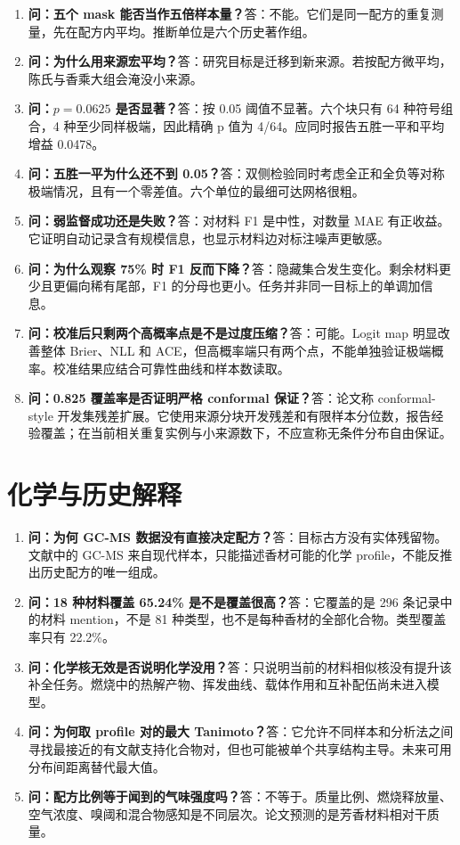\documentclass[UTF8,11pt,openany,fontset=none]{ctexbook}
\begin{document}
\begin{enumerate}[resume]
\item \textbf{问：五个 mask 能否当作五倍样本量？}\quad 答：不能。它们是同一配方的重复测量，先在配方内平均。推断单位是六个历史著作组。
\item \textbf{问：为什么用来源宏平均？}\quad 答：研究目标是迁移到新来源。若按配方微平均，陈氏与香乘大组会淹没小来源。
\item \textbf{问：$p=0.0625$ 是否显著？}\quad 答：按 0.05 阈值不显著。六个块只有 64 种符号组合，4 种至少同样极端，因此精确 p 值为 4/64。应同时报告五胜一平和平均增益 0.0478。
\item \textbf{问：五胜一平为什么还不到 0.05？}\quad 答：双侧检验同时考虑全正和全负等对称极端情况，且有一个零差值。六个单位的最细可达网格很粗。
\item \textbf{问：弱监督成功还是失败？}\quad 答：对材料 F1 是中性，对数量 MAE 有正收益。它证明自动记录含有规模信息，也显示材料边对标注噪声更敏感。
\item \textbf{问：为什么观察 75\% 时 F1 反而下降？}\quad 答：隐藏集合发生变化。剩余材料更少且更偏向稀有尾部，F1 的分母也更小。任务并非同一目标上的单调加信息。
\item \textbf{问：校准后只剩两个高概率点是不是过度压缩？}\quad 答：可能。Logit map 明显改善整体 Brier、NLL 和 ACE，但高概率端只有两个点，不能单独验证极端概率。校准结果应结合可靠性曲线和样本数读取。
\item \textbf{问：0.825 覆盖率是否证明严格 conformal 保证？}\quad 答：论文称 conformal-style 开发集残差扩展。它使用来源分块开发残差和有限样本分位数，报告经验覆盖；在当前相关重复实例与小来源数下，不应宣称无条件分布自由保证。
\end{enumerate}

\section{化学与历史解释}

\begin{enumerate}[resume]
\item \textbf{问：为何 GC-MS 数据没有直接决定配方？}\quad 答：目标古方没有实体残留物。文献中的 GC-MS 来自现代样本，只能描述香材可能的化学 profile，不能反推出历史配方的唯一组成。
\item \textbf{问：18 种材料覆盖 65.24\% 是不是覆盖很高？}\quad 答：它覆盖的是 296 条记录中的材料 mention，不是 81 种类型，也不是每种香材的全部化合物。类型覆盖率只有 22.2\%。
\item \textbf{问：化学核无效是否说明化学没用？}\quad 答：只说明当前的材料相似核没有提升该补全任务。燃烧中的热解产物、挥发曲线、载体作用和互补配伍尚未进入模型。
\item \textbf{问：为何取 profile 对的最大 Tanimoto？}\quad 答：它允许不同样本和分析法之间寻找最接近的有文献支持化合物对，但也可能被单个共享结构主导。未来可用分布间距离替代最大值。
\item \textbf{问：配方比例等于闻到的气味强度吗？}\quad 答：不等于。质量比例、燃烧释放量、空气浓度、嗅阈和混合物感知是不同层次。论文预测的是芳香材料相对干质量。
\end{enumerate}
\end{document}
